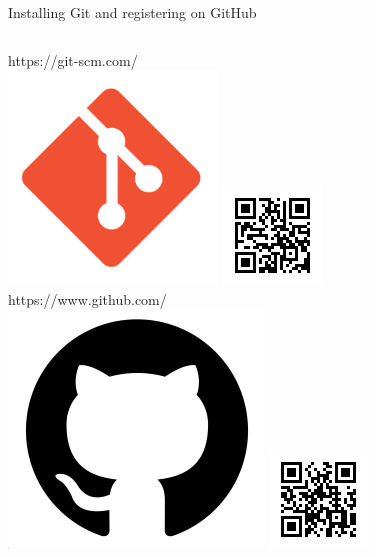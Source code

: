 \documentclass[9pt, aspectratio=169]{beamer}
\begin{document}
\begin{frame}{Installing Git and registering on GitHub}
    \begin{columns}[T]
        \begin{column}{.4\textwidth}
            \centering
            https://git-scm.com/\\
            \includegraphics[width=.4\textwidth]{git-logo.png}
            \includegraphics[width=.4\textwidth]{git_qr.png}\\
            \vspace{1em}
            https://www.github.com/\\
            \includegraphics[width=.4\textwidth]{github_logo.png}
            \includegraphics[width=.4\textwidth]{github_qr.png}

\end{column}
\end{columns}
\end{frame}
\end{document}
